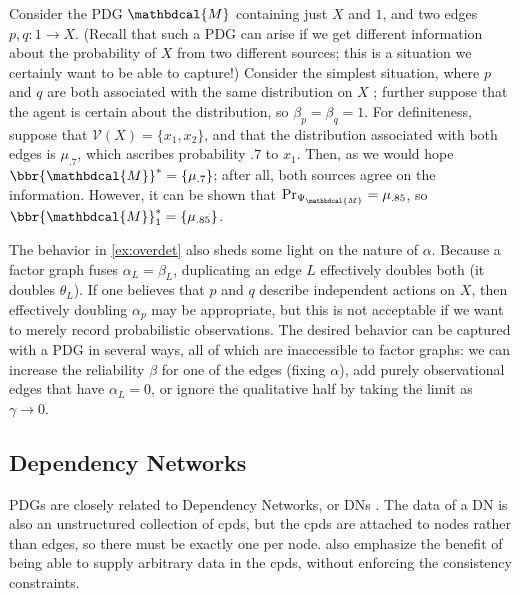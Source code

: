 \documentclass[letterpaper]{article} %
\theoremstyle{plain}
\theoremstyle{definition}
\theoremstyle{remark}
\newcommand{\valpha}[1]{{\color{red!80!black}#1}}
\newcommand{\dg}[1]{\mathbdcal{#1}}
\newcommand\GFE{\mathit{G\mkern-4mu F\mkern-4.5mu E}}
\newcommand{\V}{\mathcal V}
\newcommand{\WFGof}[1]{\Psi_{{#1}}}
\begin{document}
\begin{example}\label{ex:overdet}
Consider the PDG $\dg M$ containing just $X$ and $1$, and two edges
$p, q: 1 \to X$.
(Recall that such a PDG can arise if we get different information about the
probability of $X$ from two different 
sources; this is a situation we
certainly want to be able to capture!)
Consider the simplest situation, where $p$ and $q$ are both associated
with the same distribution on $X$%
; further suppose that the agent is certain about the distribution, so
$\beta_p = \beta_q = 1$.
For definiteness, suppose that
$\V(X) = \{x_1,x_2\}$, and
that the distribution associated with both edges is $\mu_{.7}$, which ascribes
probability $.7$ to $x_1$. Then, as we would hope  $\bbr{\dg M}^* =
\{\mu_{.7}\}$; after all, both sources agree on the information.
However, it can be shown that 
$\Pr_{\WFGof{\dg M}} = \mu_{.85}$, so  $\bbr{\dg M}_1^* = \{\mu_{.85}\}$.
\end{example}



\valpha{
The behavior in \cref{ex:overdet} also sheds some light on the nature of $\alpha$.
Because a factor graph fuses $\alpha_L = \beta_L$, duplicating an edge $L$ effectively doubles both (it doubles $\theta_L$). If one believes that $p$ and $q$ describe independent actions on $X$, then effectively doubling $\alpha_p$ may be appropriate, but this is not acceptable if we want to merely record probabilistic observations. The desired behavior can be captured with a PDG in several ways, all of which are inaccessible to factor graphs: we can increase the reliability $\beta$ for one of the edges (fixing $\alpha$), add purely observational edges that have $\alpha_L=0$, or ignore the qualitative half by taking the limit as $\gamma \to 0$.
}


\subsection{Dependency Networks}

PDGs are closely related to Dependency Networks, or DNs
\cite{heckerman2000dependency}. The data of a DN is also an unstructured
collection of cpds, but the cpds are attached to nodes rather than edges, so
there must be exactly one per node.  \citeauthor{heckerman2000dependency} also
emphasize the benefit of being able to supply arbitrary data in the cpds,
without enforcing the consistency constraints.
\end{document}
